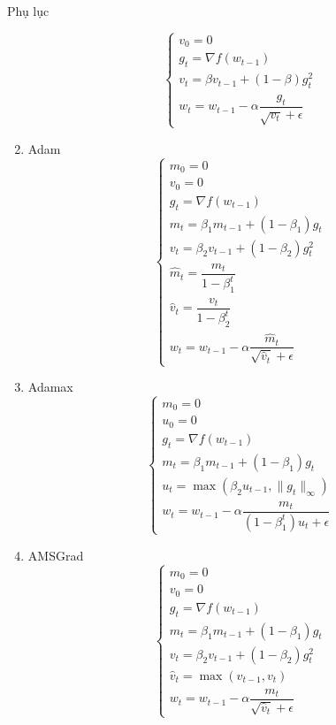 \documentclass[10pt]{beamer}
\theoremstyle{remark}
\theoremstyle{definition}
\begin{document}
\begin{frame}[allowframebreaks]{Phụ lục}
\begin{enumerate}
\begin{equation*}
			\begin{cases}v_0 = 0\\ g_t = \nabla f(w_{t-1}) \\ v_t = \beta v_{t-1} + (1-\beta)g_t^2 \\ w_t = w_{t-1} - \alpha \dfrac{g_t}{\sqrt{v_t} + \epsilon} \end{cases}
		\end{equation*}
		\item Adam
		\begin{equation*}
			\begin{cases}m_0 = 0\\ v_0 = 0\\ g_t = \nabla f(w_{t-1}) \\ m_t = \beta_1 m_{t-1} + (1-\beta_1) g_t \\ v_t = \beta_2 v_{t-1} + (1-\beta_2)g_t^2 \\
				\hat{m}_t = \dfrac{m_t}{1 - \beta_1^t} \\ \hat{v}_t = \dfrac{v_t}{1 - \beta_2^t} \\ w_t = w_{t-1} - \alpha \dfrac{\hat{m}_t}{\sqrt{\hat{v}_t} + \epsilon} \end{cases}
		\end{equation*}
		\item Adamax
		\begin{equation*}
			\begin{cases}m_0 = 0\\ u_0 = 0 \\ g_t = \nabla f(w_{t-1}) \\ m_t = \beta_1 m_{t-1} + (1-\beta_1) g_t \\ u_t = \max(\beta_2 u_{t-1}, \lVert g_t \rVert_{\infty}) \\ w_t = w_{t-1} - \alpha \dfrac{m_t}{(1 - \beta_1^t)u_t + \epsilon}\end{cases}
		\end{equation*}
		\item AMSGrad
		\begin{equation*}
			\begin{cases}m_0 = 0\\ v_0 = 0\\ g_t = \nabla f(w_{t-1}) \\ m_t = \beta_1 m_{t-1} + (1-\beta_1) g_t \\ v_t = \beta_2 v_{t-1} + (1-\beta_2)g_t^2 \\ \hat{v}_t = \max(\hat{v}_{t-1}, v_t) \\ w_t = w_{t-1} - \alpha \dfrac{m_t}{\sqrt{\hat{v}_t} + \epsilon} \end{cases}

\end{equation*}
\end{enumerate}
\end{frame}
\end{document}
